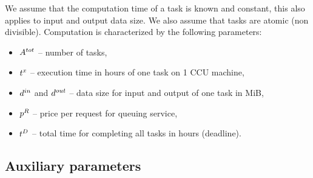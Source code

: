 {  We assume that the computation time of a task is known and constant, this also applies to input and output data size. We also assume that tasks are atomic (non divisible). Computation is characterized by the following parameters:
  \begin{itemize}
      \item $A^{tot}$ -- number of tasks,
      \item $t^x$ -- execution time in hours of one task on 1 CCU
      machine,
      \item $d^{in}$ and $d^{out}$ -- data size for input and
      output of one task in MiB,
      \item $p^{R}$ -- price per request for queuing service,
      \item $t^D$ -- total time for completing all tasks in hours (deadline).
  \end{itemize} 

\subsection{Auxiliary parameters}

}
